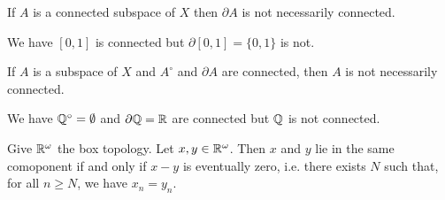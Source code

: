 \begin{example}
    If $A$ is a connected subspace of $X$ then $\partial A$ is not necessarily connected.

    We have $[0,1]$ is connected but $\partial [0,1] = \{ 0, 1 \}$ is not.
\end{example}

\begin{example}
    If $A$ is a subspace of $X$ and $A^\circ$ and $\partial A$ are connected, then $A$ is not necessarily connected.

    We have $\mathbb{Q}^\circ = \emptyset$ and $\partial \mathbb{Q} = \mathbb{R}$ are connected but $\mathbb{Q}$ is not connected.
\end{example}

\begin{proposition}
    Give $\mathbb{R}^\omega$ the box topology. Let $x, y \in \mathbb{R}^\omega$. Then $x$ and $y$ lie in the same comoponent if and only if $x-y$ is eventually zero, i.e.
    there exists $N$ such that, for all $n \geq N$,
    we have $x_n = y_n$.
\end{proposition}

